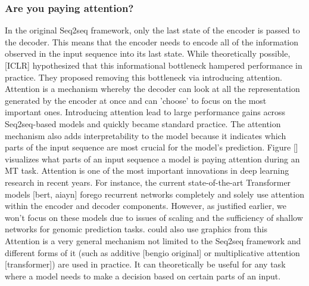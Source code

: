 \subsubsection{Are you paying attention?}
In the original Seq2seq framework, only the last state of the encoder is passed to the decoder. This means that the encoder needs to encode all of the information observed in the input sequence into its last state. While theoretically possible, [ICLR] hypothesized that this informational bottleneck hampered performance in practice. They proposed removing this bottleneck via introducing attention. Attention is a mechanism whereby the decoder can look at all the representation generated by the encoder at once and can 'choose' to focus on the most important ones. Introducing attention lead to large performance gains across Seq2seq-based models and quickly became standard practice. The attention mechanism also adds interpretability to the model because it indicates which parts of the input sequence are most crucial for the model's prediction. Figure [] visualizes what parts of an input sequence a model is paying attention during an MT task. Attention is one of the most important innovations in deep learning research in recent years. For instance, the current state-of-the-art Transformer models [bert, aiayn] forego recurrent networks completely and solely use attention within the encoder and decoder components.
However, as justified earlier, we won't focus on these models due to issues of scaling and the sufficiency of shallow networks for genomic prediction tasks.
could also use graphics from this
Attention is a very general mechanism not limited to the Seq2seq framework and different forms of it (such as additive [bengio original] or multiplicative attention [transformer]) are used in practice. It can theoretically be useful for any task where a model needs to make a decision based on certain parts of an input.
